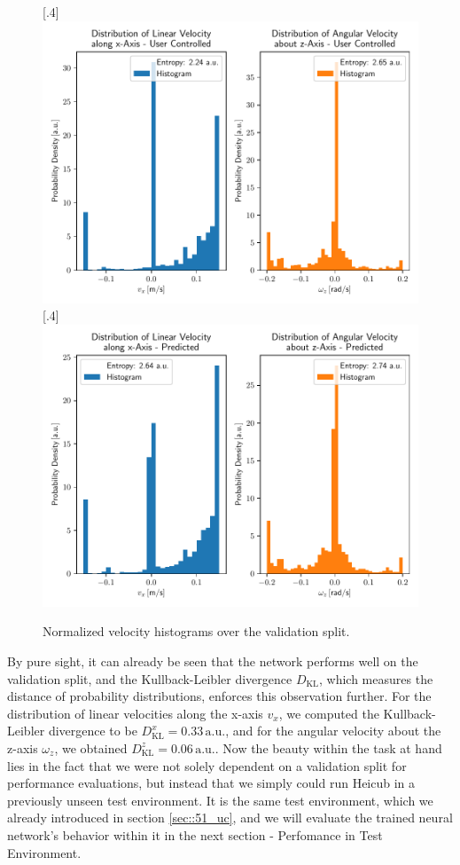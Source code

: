 \begin{figure}[h]
	\centering
	[.4\linewidth]{\includegraphics[scale=.35]{chapters/05_experiments/02_autonomous_walking/user_entropy.pdf}}
	[.4\linewidth]{\includegraphics[scale=.35]{chapters/05_experiments/02_autonomous_walking/predicted_entropy_kldivx_0_33_kldivz_0_06_imgs_13441_duration_4_ms.pdf}}
	\caption{Normalized velocity histograms over the validation split.}
	\label{fig::523_training_dist}
\end{figure}
By pure sight, it can already be seen that the network performs well on the validation split, and the Kullback-Leibler divergence $D_\text{KL}$, which measures the distance of probability distributions, enforces this observation further. For the distribution of linear velocities along the x-axis $v_x$, we computed the Kullback-Leibler divergence to be $D^x_\text{KL}=0.33\,\text{a.u.}$, and for the angular velocity about the z-axis $\omega_z$, we obtained $D^z_\text{KL}=0.06\,\text{a.u.}$. Now the beauty within the task at hand lies in the fact that we were not solely dependent on a validation split for performance evaluations, but instead that we simply could run Heicub in a previously unseen test environment. It is the same test environment, which we already introduced in section \ref{sec::51_uc}, and we will evaluate the trained neural network's behavior within it in the next section - Perfomance in Test Environment.
